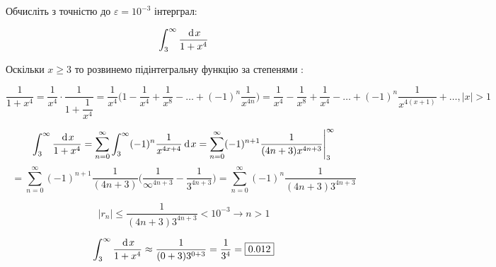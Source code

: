 Обчисліть з точністю до $\varepsilon=10^{-3}$ інтерграл:

$$
  \int_{3}^{\infty} \dfrac{\hspace{2pt}\text{d}\hspace{1pt}{x}}{1+x^4}
$$

Оскільки $x \geqslant 3 $ то розвинемо підінтегральну функцію за степенями :

$$
\dfrac{1}{1+x^4}
= \dfrac{1}{x^4} \cdot \dfrac{1}{1+\dfrac{1}{x^4}}
= \dfrac{1}{x^4} \Big( 1 - \dfrac{1}{x^4} + \dfrac{1}{x^8} - \ldots + (-1)^n\dfrac{1}{x^{4n}}\Big)
= \dfrac{1}{x^4} - \dfrac{1}{x^8} + \dfrac{1}{x^4} - \ldots + (-1)^n\dfrac{1}{x^{4(x+1)}}+\ldots, |x| > 1
$$

\M{Проінтегруємо цей ряд на порміжку $[3;+\infty)$ який належить області збіжності ряду.}

$$
\int^\infty_{3} \dfrac{\hspace{2pt}\text{d}\hspace{1pt}{x}}{1+x^4}
= \sum^\infty_{n=0} \int^\infty_{3} (-1)^n\dfrac{1}{x^{4x+4}} \hspace{2pt}\text{d}\hspace{1pt}{x}
= \sum^\infty_{n=0}(-1)^{n+1} \dfrac{1}{(4n+3)x^{4n+3}} \Bigg|^\infty_{3}
$$
$$
= \sum^\infty_{n=0}(-1)^{n+1} \dfrac{1}{(4n+3)} \Bigg( \dfrac{1}{\infty^{4n+3}} - \dfrac{1}{3^{4n+3}} \Bigg) = \sum^\infty_{n=0}(-1)^n \dfrac{1}{(4n+3)3^{4n+3}}
$$


$$\Big|r_n\Big| \leqslant \dfrac{1}{(4n+3)3^{4n+3}} < 10^{-3} \rightarrow n > 1$$

$$
  \int_{3}^{\infty} \dfrac{\hspace{2pt}\text{d}\hspace{1pt}{x}}{1+x^4} \approx \dfrac{1}{(0+3)3^{0+3}} = \dfrac{1}{3^4} = \boxed{0.012}
$$
